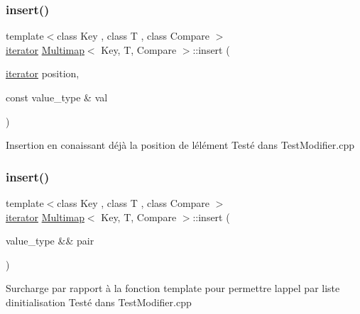 \subsubsection{\texorpdfstring{insert()}{insert()}\hspace{0.1cm}{\footnotesize\ttfamily [1/4]}}
{\footnotesize\ttfamily template$<$class Key , class T , class Compare $>$ \\
\hyperlink{classMultimapIterator}{iterator} \hyperlink{classMultimap}{Multimap}$<$ Key, T, Compare $>$\+::insert (\begin{DoxyParamCaption}\item[{\hyperlink{classMultimapIterator}{iterator}}]{position,  }\item[{const value\+\_\+type \&}]{val }\end{DoxyParamCaption})\hspace{0.3cm}{\ttfamily [inline]}}

Insertion en conaissant déjà la position de l\textquotesingle{}élément Testé dans Test\+Modifier.\+cpp \mbox{\label{classMultimap_aef5529b0f81f2262e6a9de27a5e47389}} 
\subsubsection{\texorpdfstring{insert()}{insert()}\hspace{0.1cm}{\footnotesize\ttfamily [2/4]}}
{\footnotesize\ttfamily template$<$class Key , class T , class Compare $>$ \\
\hyperlink{classMultimapIterator}{iterator} \hyperlink{classMultimap}{Multimap}$<$ Key, T, Compare $>$\+::insert (\begin{DoxyParamCaption}\item[{value\+\_\+type \&\&}]{pair }\end{DoxyParamCaption})\hspace{0.3cm}{\ttfamily [inline]}}

Surcharge par rapport à la fonction template pour permettre l\textquotesingle{}appel par liste d\textquotesingle{}initialisation Testé dans Test\+Modifier.\+cpp \mbox{\label{classMultimap_a62ba469ffdf46652eaa8ac007c590031}} 

